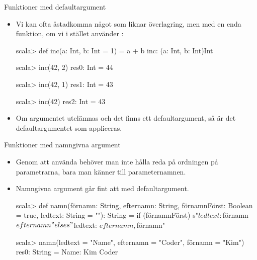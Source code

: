 \begin{Slide}{Funktioner med defaultargument}\SlideFontSmall

\begin{itemize}
\item Vi kan ofta åstadkomma något som liknar överlagring, men med en enda funktion, om vi i stället använder :
\begin{REPLnonum}
scala> def inc(a: Int, b: Int = 1) = a + b
inc: (a: Int, b: Int)Int

scala> inc(42, 2)
res0: Int = 44

scala> inc(42, 1)
res1: Int = 43

scala> inc(42)
res2: Int = 43

\end{REPLnonum}
\item Om argumentet utelämnas och det finns ett defaultargument, så är det defaultargumentet som appliceras.
\end{itemize}
\end{Slide}


\begin{Slide}{Funktioner med namngivna argument}
\begin{itemize}
\item Genom att använda  behöver man inte hålla reda på ordningen på parametrarna, bara man känner till parameternamnen.
\item Namngivna argument går fint att  med defaultargument.
\begin{REPL}
scala> def namn(förnamn: String,
                efternamn: String,
                förnamnFörst: Boolean = true,
                ledtext: String = ""): String =
         if (förnamnFörst) s"$ledtext: $förnamn $efternamn"
         else s"$ledtext: $efternamn, $förnamn"

scala> namn(ledtext = "Name", efternamn = "Coder", förnamn = "Kim")
res0: String = Name: Kim Coder
\end{REPL}
\end{itemize}
\end{Slide}


